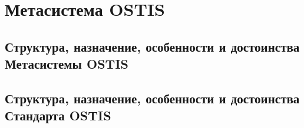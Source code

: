 \chapter{Метасистема OSTIS}
\label{chapter_ims_standard}

\section{Структура, назначение, особенности и достоинства Метасистемы OSTIS}
\section{Структура, назначение, особенности и достоинства Стандарта OSTIS}

%